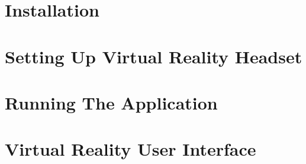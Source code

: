 \documentclass[]{tukethesis}
\begin{document}

\section{Installation}

\section{Setting Up Virtual Reality Headset}

\section{Running The Application}

\section{Virtual Reality User Interface}


\end{document}
